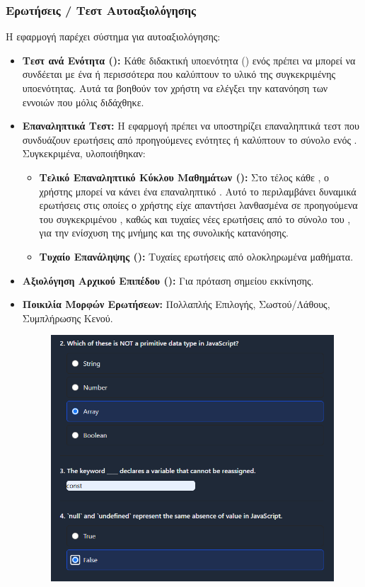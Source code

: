 \subsubsection{Ερωτήσεις / Τεστ Αυτοαξιολόγησης}
\label{sec:test_autoaxiologisis}
Η εφαρμογή παρέχει σύστημα για  αυτοαξιολόγησης:
\begin{itemize}[leftmargin=*, noitemsep]
    \item \textbf{Τεστ ανά Ενότητα ():} Κάθε διδακτική υποενότητα () ενός  πρέπει να μπορεί να συνδέεται με ένα ή περισσότερα  που καλύπτουν το υλικό της συγκεκριμένης υποενότητας. Αυτά τα  βοηθούν τον χρήστη να ελέγξει την κατανόηση των εννοιών που μόλις διδάχθηκε.
    \item \textbf{Επαναληπτικά Τεστ:} Η εφαρμογή πρέπει να υποστηρίζει επαναληπτικά τεστ που συνδυάζουν ερωτήσεις από προηγούμενες ενότητες ή καλύπτουν το σύνολο ενός . Συγκεκριμένα, υλοποιήθηκαν:
    \begin{itemize}[leftmargin=*, noitemsep]
        \item \textbf{Τελικό Επαναληπτικό  Κύκλου Μαθημάτων ():} Στο τέλος κάθε , ο χρήστης μπορεί να κάνει ένα επαναληπτικό . Αυτό το  περιλαμβάνει δυναμικά ερωτήσεις στις οποίες ο χρήστης είχε απαντήσει λανθασμένα σε προηγούμενα  του συγκεκριμένου , καθώς και τυχαίες νέες ερωτήσεις από το σύνολο του , για την ενίσχυση της μνήμης και της συνολικής κατανόησης.
        \item \textbf{Τυχαίο  Επανάληψης ():} Τυχαίες ερωτήσεις από ολοκληρωμένα μαθήματα.
    \end{itemize}
    \item \textbf{Αξιολόγηση Αρχικού Επιπέδου ():} Για πρόταση σημείου εκκίνησης.
    \item \textbf{Ποικιλία Μορφών Ερωτήσεων:} Πολλαπλής Επιλογής, Σωστού/Λάθους, Συμπλήρωσης Κενού.
        \begin{figure}[h!]
          \centering
          \includegraphics[scale=0.4]{images/question_types.png}

\end{figure}
\end{itemize}
